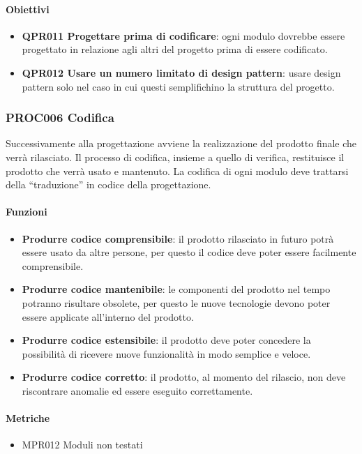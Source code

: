         \paragraph{Obiettivi}
        \begin{itemize}
            \item \textbf{QPR011 Progettare prima di codificare}: ogni modulo dovrebbe essere progettato in relazione agli altri del progetto prima di essere codificato.
            \item \textbf{QPR012 Usare un numero limitato di design pattern}: usare design pattern solo nel caso in cui questi semplifichino la struttura del progetto.
        \end{itemize}

    \subsubsection{PROC006 Codifica}\label{proc006}
    Successivamente alla progettazione avviene la realizzazione del prodotto finale che verrà rilasciato. Il processo di codifica, insieme a quello di verifica, restituisce il prodotto che verrà usato e mantenuto. La codifica di ogni modulo deve trattarsi della ``traduzione'' in codice della progettazione.

        \paragraph{Funzioni}
        \begin{itemize}
            \item \textbf{Produrre codice comprensibile}: il prodotto rilasciato in futuro potrà essere usato da altre persone, per questo il codice deve poter essere facilmente comprensibile.
            \item \textbf{Produrre codice mantenibile}: le componenti del prodotto nel tempo potranno risultare obsolete, per questo le nuove tecnologie devono poter essere applicate all'interno del prodotto.
            \item \textbf{Produrre codice estensibile}: il prodotto deve poter concedere la possibilità di ricevere nuove funzionalità in modo semplice e veloce.
            \item \textbf{Produrre codice corretto}: il prodotto, al momento del rilascio, non deve riscontrare anomalie ed essere eseguito correttamente.
        \end{itemize}

        \paragraph{Metriche}
        \begin{itemize}
            \item MPR012 Moduli non testati
        \end{itemize}

